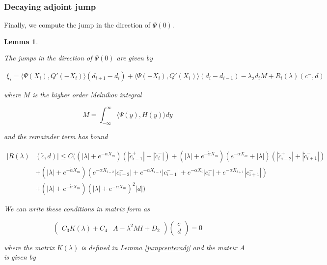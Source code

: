 \documentclass[12pt]{article}
\newtheorem{lemma}{Lemma}
\begin{document}
\subsubsection{Decaying adjoint jump}

Finally, we compute the jump in the direction of $\Psi(0)$.

\begin{lemma}\label{jumpadj}

The jumps in the direction of $\Psi(0)$ are given by

\begin{align}\label{xi}
\xi_i = \langle \Psi(X_i), Q'(-X_i) \rangle (d_{i+1} - d_i)
+ \langle \Psi(-X_i), Q'(X_i) \rangle (d_i - d_{i-1})
- \lambda_2 d_i M + R_i(\lambda)(c^-, d)
\end{align}

where $M$ is the higher order Melnikov integral

\begin{equation}\label{M}
M = \int_{-\infty}^\infty \langle \Psi(y), H(y) \rangle dy 
\end{equation}

and the remainder term has bound

\begin{align}\label{R}
|R(\lambda)&(\tilde{c}, d)| \leq C \Big(
(|\lambda| + e^{-\alpha X_m})(|\tilde{c}_{i-1}^+| + |\tilde{c}_{i}^-|) + (|\lambda| + e^{-\tilde{\alpha} X_m})(e^{-\alpha X_m} + |\lambda|) ( |\tilde{c}_{i-2}^+| + |\tilde{c}_{i+1}^-|) \\
&+ (|\lambda| + e^{-\tilde{\alpha} X_m})( e^{-\alpha X_{i-2}} |c_{i-2}^-| + e^{-\alpha X_{i-1}} |c_{i-1}^-| + e^{-\alpha X_i} |c_i^-| + e^{-\alpha X_{i+1}} |c_{i+1}^-|) \nonumber \\
&+ (|\lambda| + e^{-\tilde{\alpha} X_m})(|\lambda| + e^{-\alpha X_m})^2 |d| \nonumber \Big)
\end{align}

We can write these conditions in matrix form as

\begin{equation}
\begin{pmatrix}
C_3 K(\lambda) + C_4 & A -\lambda^2 M I + D_2
\end{pmatrix}
\begin{pmatrix}c \\ d \end{pmatrix} = 0
\end{equation}

where the matrix $K(\lambda)$ is defined in Lemma \ref{jumpcenteradj} and the matrix $A$ is given by


\end{lemma}
\end{document}

